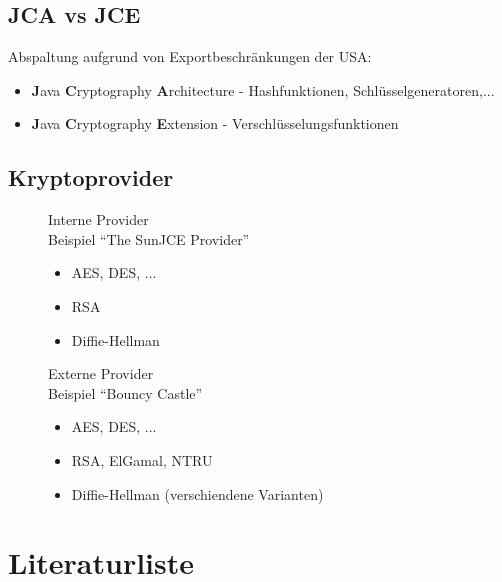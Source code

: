 \documentclass[10pt,a4paper]{article}
\begin{document}
\subsection{JCA vs JCE}
Abspaltung aufgrund von Exportbeschränkungen der USA:
\begin{itemize}
\item \textbf{J}ava \textbf{C}ryptography \textbf{A}rchitecture - Hashfunktionen, Schlüsselgeneratoren,...
\item \textbf{J}ava \textbf{C}ryptography \textbf{E}xtension - Verschlüsselungsfunktionen
\end{itemize}

\subsection{Kryptoprovider}
\begin{figure}[!ht]
\begin{minipage}[t]{0.45\linewidth}
\centering
Interne Provider\\
Beispiel "`The SunJCE Provider"'
\begin{itemize}
\item AES, DES, ...
\item RSA
\item Diffie-Hellman
\end{itemize}
\end{minipage}
\hspace{0.5cm}
\begin{minipage}[t]{0.45\linewidth}
\centering
Externe Provider\\
Beispiel "`Bouncy Castle"'
\begin{itemize}
\item AES, DES, ...
\item RSA, ElGamal, NTRU
\item Diffie-Hellman (verschiendene Varianten)
\end{itemize}
\end{minipage}
\end{figure}


\section{Literaturliste}
\nocite{Eckert13}
\nocite{Engelbrecht04}
{}

\end{document}
